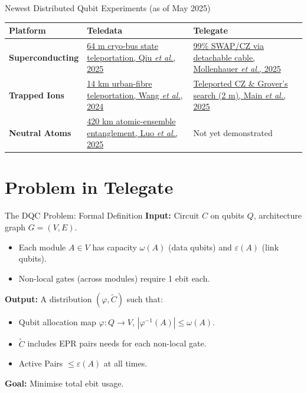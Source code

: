 \documentclass{beamer}
\begin{document}
	\begin{frame}{Newest Distributed Qubit Experiments (as of May 2025)}
		\scriptsize
		\begin{tabular}{@{}p{2.2cm}p{4.2cm}p{4.2cm}@{}}
			\toprule
			\textbf{Platform} & \textbf{Teledata} & \textbf{Telegate} \\ \midrule
			
			\textbf{Superconducting} 
			& \href{https://arxiv.org/abs/2302.08756}{64 m cryo-bus state teleportation, Qiu \emph{et al.}, 2025} 
			& \href{https://arxiv.org/abs/2407.16743}{\scriptsize99\% SWAP/CZ via detachable cable, Mollenhauer \emph{et al.}, 2025} \\
			
			\textbf{Trapped Ions} 
			& \href{https://www.nature.com/articles/s41534-024-00886-x}{14 km urban-fibre teleportation, Wang \emph{et al.}, 2024} 
			& \href{https://www.nature.com/articles/s41586-024-08404-x}{Teleported CZ \& Grover’s search (2 m), Main \emph{et al.}, 2025} \\
			
			\textbf{Neutral Atoms} 
			& \href{https://arxiv.org/abs/2504.05660}{420 km atomic-ensemble entanglement, Luo \emph{et al.}, 2025} 
			& Not yet demonstrated \\
			
			\bottomrule
		\end{tabular}
	\end{frame}
	\section{Problem in Telegate}
	
	\begin{frame}{The DQC Problem: Formal Definition}
		\textbf{Input:} Circuit $C$ on qubits $Q$, architecture graph $G=(V,E)$.
		
		\begin{itemize}
			\item Each module $A \in V$ has capacity $\omega(A)$ (data qubits) and $\varepsilon(A)$ (link qubits).
			\item Non-local gates (across modules) require 1 ebit each.
		\end{itemize}
		
		\textbf{Output:} A distribution $(\varphi, \tilde{C})$ such that:
		\begin{itemize}
			\item Qubit allocation map $\varphi: Q \rightarrow V$, $|\varphi^{-1}(A)| \le \omega(A)$.
			\item $\tilde{C}$ includes EPR pairs needs for each non-local gate.
			\item Active Pairs $\le \varepsilon(A)$ at all times.
		\end{itemize}
		
		\textbf{Goal:} Minimise total ebit usage.
	\end{frame}
	
\end{document}
